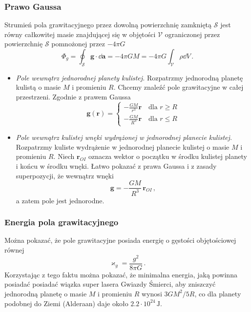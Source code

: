 \documentclass[../main.tex]{subfiles}
\begin{document}
\subsubsection*{Prawo Gaussa}
Strumień pola grawitacyjnego przez dowolną powierzchnię zamkniętą \(\mathcal{S}\) jest równy całkowitej masie znajdującej się w objętości \(\mathcal{V}\) ograniczonej przez powierzchnię \(\mathcal{S}\) pomnożonej przez \(-4\pi G\)
\begin{equation*}
    \Phi_{g}=\oint_{\mathcal{S}}\mathbf{g}\cdot \dd\mathbf{a}=-4\pi GM=-4\pi G\int_{\mathcal{V}}\rho \dd{V}\,.
\end{equation*}
\begin{itemize}
    \item \textit{Pole wewnątrz jednorodnej planety kulistej.} Rozpatrzmy jednorodną planetę kulistą o masie \(M\) i promieniu \(R\). Chcemy znaleźć pole grawitacyjne w całej przestrzeni. Zgodnie z prawem Gaussa
\begin{equation*}
    \mathbf{g}(\mathbf{r})=\begin{cases}-\frac{GM}{r^3}\mathbf{r}\quad\text{dla \(r\geq R\)}\\
    -\frac{GM}{R^3}\mathbf{r}\quad\text{dla \(r\leq R\)}
    \end{cases}
\end{equation*}

\item \textit{Pole wewnątrz kulistej wnęki wydrążonej w jednorodnej planecie kulistej.} Rozpatrzmy kuliste wydrążenie w jednorodnej planecie kulistej o masie \(M\) i promieniu \(R\). Niech \(\mathbf{r}_{OI}\) oznacza wektor o początku w środku kulistej planety i końcu w środku wnęki. Łatwo pokazać z prawa Gaussa i z zasady superpozycji, że wewnątrz wnęki
\begin{equation*}
    \mathbf{g}=-\frac{GM}{R^3}\,\mathbf{r}_{OI}\,,
\end{equation*}
a zatem pole jest jednorodne.
\end{itemize}

\subsubsection{Energia pola grawitacyjnego}
Można pokazać, że pole grawitacyjne posiada energię o gęstości objętościowej równej
\begin{equation*}
    \varkappa_{g}=\frac{g^2}{8\pi G}\,.
\end{equation*}
Korzystając z tego faktu można pokazać, że minimalna energia, jaką powinna posiadać posiadać wiązka super lasera Gwiazdy Śmierci, aby zniszczyć jednorodną planetę o masie \(M\) i promieniu \(R\) wynosi \(3GM^2/5R\), co dla planety podobnej do Ziemi (Alderaan) daje około \(2.2\cdot10^{24}\,\text{J}\).
\end{document}
